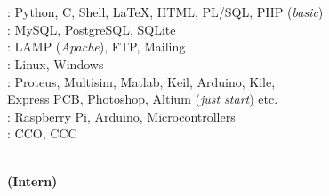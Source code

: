 \documentclass[a4paper,11pt]{memoir} %
\begin{document}
\begin{minipage}[t]{0.20\columnwidth}
 \\
 \\
 \\
\\
 \\
\quad \\
\\

\end{minipage}
\hfill
\begin{minipage}[t]{0.80\columnwidth}
: Python, C, Shell, \LaTeX, HTML, PL/SQL, PHP (\textit{basic})\\
: MySQL, PostgreSQL, SQLite \\ 
: LAMP (\textit{Apache}), FTP, Mailing \\
: Linux, Windows\\
: Proteus, Multisim, Matlab, Keil, Arduino, Kile,\\ \phantom{.} %
Express PCB, Photoshop, Altium (\textit{just start}) etc.\\
: Raspberry Pi, Arduino, Microcontrollers\\ 
: CCO, CCC
\end{minipage}


\Sep %


\begin{minipage}[t]{0.20\columnwidth}
\end{minipage}
\hfill
\begin{minipage}[t]{0.80\columnwidth}
\begin{center}
\\
\textbf{(Intern)}
\end{center}
\end{minipage}
\Sep
\end{document}
